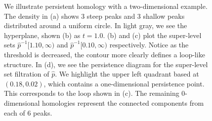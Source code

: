 \documentclass[12pt]{article}
\newcommand{\brittany}[1]{{\color{cyan} Brittany says: #1}}
\newcommand{\figref}[1]{Figure~\ref{#1}}
\def\R{{\mathbb R}}
\begin{document}
\begin{figure}
\begin{subfigure}{.20\linewidth}
    \label{fig:example_pd}
  \end{subfigure}
  \caption{ We illustrate persistent homology with a two-dimensional example. The density in (a) shows 3 steep peaks and 3 shallow peaks  distributed around a uniform circle. In light gray, we see the hyperplane, shown (b) as $t=1.0$. (b) and (c) plot the super-level sets $\widehat{p}^{-1}[1.10,\infty)$ and $\widehat{p}^{-1}[0.10,\infty)$ respectively. Notice as the threshold is decreased, the contour more clearly defines a loop-like structure. In (d), we see the  persistence diagram for the super-level set filtration of $\widehat{p}$. We highlight the upper left quadrant based at $(0.18, 0.02)$, which contains a one-dimensional persistence point. This corresponds to the loop shown in (c). The remaining 0-dimensional homologies represent the connected components from each of 6 peaks.} %
    \label{fig:homologyexample}
\end{figure}

%
\end{document}
